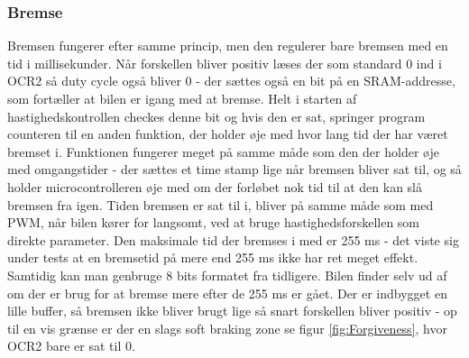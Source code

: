 \subsubsection{Bremse}
Bremsen fungerer efter samme princip, men den regulerer bare bremsen med en tid i millisekunder. Når forskellen bliver positiv læses der som standard 0 ind i OCR2 så duty cycle også bliver 0 - der sættes også en bit på en SRAM-addresse, som fortæller at bilen er igang med at bremse. Helt i starten af hastighedskontrollen checkes denne bit og hvis den er sat, springer program counteren til en anden funktion, der holder øje med hvor lang tid der har været bremset i. Funktionen fungerer meget på samme måde som den der holder øje med omgangstider - der sættes et time stamp lige når bremsen bliver sat til, og så holder microcontrolleren øje med om der forløbet nok tid til at den kan slå bremsen fra igen. Tiden bremsen er sat til i, bliver på samme måde som med PWM, når bilen kører for langsomt, ved at bruge hastighedsforskellen som direkte parameter. Den maksimale tid der bremses i med er 255 ms - det viste sig under tests at en bremsetid på mere end 255 ms ikke har ret meget effekt. Samtidig kan man genbruge 8 bits formatet fra tidligere. Bilen finder selv ud af om der er brug for at bremse mere efter de 255 ms er gået. Der er indbygget en lille buffer, så bremsen ikke bliver brugt lige så snart forskellen bliver positiv - op til en vis grænse er der en slags soft braking zone se figur \ref{fig:Forgiveness}, hvor OCR2 bare er sat til 0. 
